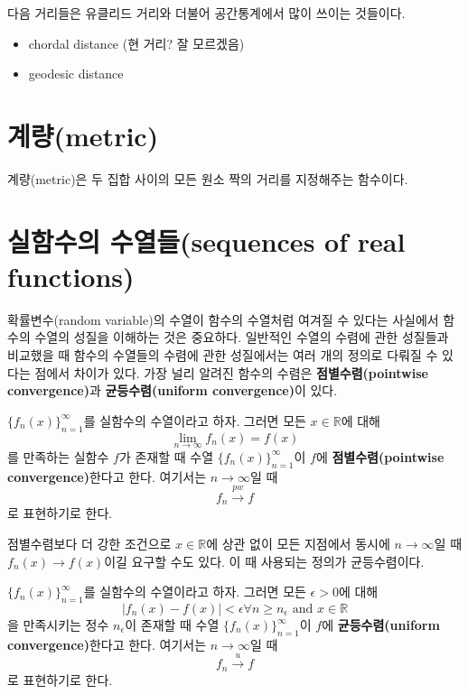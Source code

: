 \documentclass[b5paper,]{scrbook}
\theoremstyle{plain}
\theoremstyle{definition}
\numberwithin{equation}{section}
\let\BeginKnitrBlock\begin \let\EndKnitrBlock\end
\begin{document}
다음 거리들은 유클리드 거리와 더불어 공간통계에서 많이 쓰이는 것들이다.

\begin{itemize}
\item
  chordal distance (현 거리? 잘 모르겠음)
\item
  geodesic distance
\end{itemize}

\section{계량(metric)}\label{metric}

계량(metric)은 두 집합 사이의 모든 원소 짝의 거리를 지정해주는 함수이다.

\section{실함수의 수열들(sequences of real
functions)}\label{-sequences-of-real-functions}

확률변수(random variable)의 수열이 함수의 수열처럼 여겨질 수 있다는
사실에서 함수의 수열의 성질을 이해하는 것은 중요하다. 일반적인 수열의
수렴에 관한 성질들과 비교했을 때 함수의 수열들의 수렴에 관한 성질에서는
여러 개의 정의로 다뤄질 수 있다는 점에서 차이가 있다. 가장 널리 알려진
함수의 수렴은 \textbf{점별수렴(pointwise convergence)}과
\textbf{균등수렴(uniform convergence)}이 있다.

\BeginKnitrBlock{definition}[점별수렴]
\protect\hypertarget{def:unnamed-chunk-20}{}{\label{def:unnamed-chunk-20}
{} }\(\{ f_{n}(x)\}_{n=1}^{\infty}\)를 실함수의
수열이라고 하자. 그러면 모든 \(x\in\mathbb{R}\)에 대해
\[\lim_{n\rightarrow \infty}f_{n}(x)=f(x)\] 를 만족하는 실함수 \(f\)가
존재할 때 수열 \(\{ f_{n}(x)\}_{n=1}^{\infty}\)이 \(f\)에
\textbf{점별수렴(pointwise convergence)}한다고 한다. 여기서는
\(n\rightarrow \infty\)일 때 \[f_{n} \stackrel{pw}{\rightarrow} f\] 로
표현하기로 한다.
\EndKnitrBlock{definition}

점별수렴보다 더 강한 조건으로 \(x \in \mathbb{R}\)에 상관 없이 모든
지점에서 동시에 \(n\rightarrow\infty\)일 때
\(f_{n}(x) \rightarrow f(x)\)이길 요구할 수도 있다. 이 때 사용되는
정의가 균등수렴이다.

\BeginKnitrBlock{definition}[균등수렴]
\protect\hypertarget{def:unnamed-chunk-21}{}{\label{def:unnamed-chunk-21}
{} }\(\{ f_{n}(x)\}_{n=1}^{\infty}\)를 실함수의
수열이라고 하자. 그러면 모든 \(\epsilon > 0\)에 대해
\[|f_{n}(x)-f(x)| <\epsilon \forall n \geq n_{\epsilon} \text{ and } x\in \mathbb{R}\]
을 만족시키는 정수 \(n_{\epsilon}\)이 존재할 때 수열
\(\{ f_{n}(x)\}_{n=1}^{\infty}\)이 \(f\)에 \textbf{균등수렴(uniform
convergence)}한다고 한다. 여기서는 \(n\rightarrow \infty\)일 때
\[f_{n} \stackrel{u}{\rightarrow} f\] 로 표현하기로 한다.
\EndKnitrBlock{definition}
\end{document}
